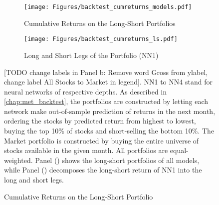 		\begin{figure}	
			\centering		
			\begin{subfigure}[t]{\textwidth}
				\centering	
				\texttt{[image: Figures/backtest\_cumreturns\_models.pdf]}
				\caption{Cumulative Returns on the Long-Short Portfolios}
				\label{fig:backtest_cumreturns_models}
			\end{subfigure}
			
			\begin{subfigure}[t]{\textwidth}
				\texttt{[image: Figures/backtest\_cumreturns\_ls.pdf]}
				\caption{Long and Short Legs of the Portfolio (NN1)}
				\label{fig:backtest_cumreturns_ls}
			\end{subfigure}
			\caption{Cumulative Returns on the Long-Short Portfolio}
			\medskip
			\small
			[TODO change labels in Panel b: Remove word Gross from ylabel, change label All Stocks to Market in legend]. NN1 to NN4 stand for neural networks of respective depths. As described in \ref{chap:met_backtest}, the portfolios are constructed by letting each network make out-of-sample prediction of returns in the next month, ordering the stocks by predicted return from highest to lowest, buying the top 10\% of stocks and short-selling the bottom 10\%. The Market portfolio is constructed by buying the entire universe of stocks available in the given month. All portfolios are equal-weighted. Panel () shows the long-short portfolios of all models, while Panel () decomposes the long-short return of NN1 into the long and short legs. 
			\label{fig:cumulative_return}
		\end{figure}     
		
